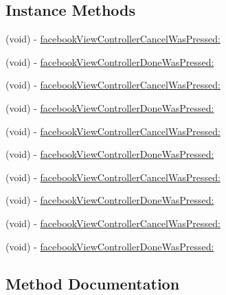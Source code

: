 \subsection*{Instance Methods}
\begin{DoxyCompactItemize}
\item 
(void) -\/ \hyperlink{protocolFBViewControllerDelegate_01-p_a00faa93faf7a9c1228c24e0fbc87738b}{facebook\+View\+Controller\+Cancel\+Was\+Pressed\+:}
\item 
(void) -\/ \hyperlink{protocolFBViewControllerDelegate_01-p_aaba5fa381dc330b33a2931e1b1b7589c}{facebook\+View\+Controller\+Done\+Was\+Pressed\+:}
\item 
(void) -\/ \hyperlink{protocolFBViewControllerDelegate_01-p_a00faa93faf7a9c1228c24e0fbc87738b}{facebook\+View\+Controller\+Cancel\+Was\+Pressed\+:}
\item 
(void) -\/ \hyperlink{protocolFBViewControllerDelegate_01-p_aaba5fa381dc330b33a2931e1b1b7589c}{facebook\+View\+Controller\+Done\+Was\+Pressed\+:}
\item 
(void) -\/ \hyperlink{protocolFBViewControllerDelegate_01-p_a00faa93faf7a9c1228c24e0fbc87738b}{facebook\+View\+Controller\+Cancel\+Was\+Pressed\+:}
\item 
(void) -\/ \hyperlink{protocolFBViewControllerDelegate_01-p_aaba5fa381dc330b33a2931e1b1b7589c}{facebook\+View\+Controller\+Done\+Was\+Pressed\+:}
\item 
(void) -\/ \hyperlink{protocolFBViewControllerDelegate_01-p_a00faa93faf7a9c1228c24e0fbc87738b}{facebook\+View\+Controller\+Cancel\+Was\+Pressed\+:}
\item 
(void) -\/ \hyperlink{protocolFBViewControllerDelegate_01-p_aaba5fa381dc330b33a2931e1b1b7589c}{facebook\+View\+Controller\+Done\+Was\+Pressed\+:}
\item 
(void) -\/ \hyperlink{protocolFBViewControllerDelegate_01-p_a00faa93faf7a9c1228c24e0fbc87738b}{facebook\+View\+Controller\+Cancel\+Was\+Pressed\+:}
\item 
(void) -\/ \hyperlink{protocolFBViewControllerDelegate_01-p_aaba5fa381dc330b33a2931e1b1b7589c}{facebook\+View\+Controller\+Done\+Was\+Pressed\+:}
\end{DoxyCompactItemize}


\subsection{Method Documentation}
\mbox{\label{protocolFBViewControllerDelegate_01-p_a00faa93faf7a9c1228c24e0fbc87738b}} 
